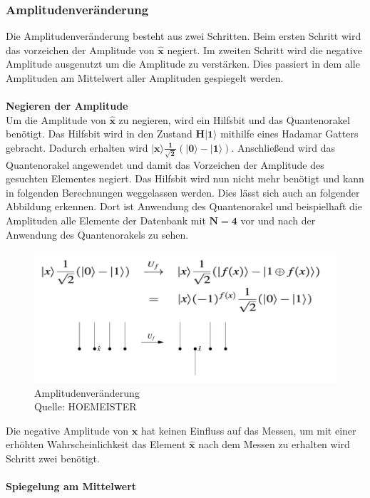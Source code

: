 \subsubsection{Amplitudenveränderung}
Die Amplitudenveränderung besteht aus zwei Schritten. Beim ersten Schritt wird das vorzeichen der Amplitude von $\mathbf{\hat x}$ negiert. Im zweiten Schritt wird die negative Amplitude ausgenutzt um die Amplitude zu verstärken. Dies passiert in dem alle Amplituden am Mittelwert aller Amplituden gespiegelt werden. 
\\ \\
\textbf{Negieren der Amplitude}
 \\
Um die Amplitude von $\mathbf{\hat x}$ zu negieren, wird ein Hilfsbit und das Quantenorakel benötigt. Das Hilfsbit wird in den Zustand $\mathbf{H|1\rangle}$ mithilfe eines Hadamar Gatters gebracht. Dadurch erhalten wird $\mathbf{|x\rangle \frac{1}{\sqrt 2}(|0\rangle - |1\rangle )}$. Anschließend wird das Quantenorakel angewendet und damit das Vorzeichen der Amplitude des gesuchten Elementes negiert. Das Hilfsbit wird nun nicht mehr benötigt und kann in folgenden Berechnungen weggelassen werden. Dies lässt sich auch an folgender Abbildung erkennen. Dort ist Anwendung des Quantenorakel und beispielhaft die Amplituden alle Elemente der Datenbank mit $\mathbf{N=4}$ vor und nach der Anwendung des Quantenorakels zu sehen.
\begin{figure}[hbtp]
	\centering
	\includegraphics[width=.8\textwidth]{figures/amplitudenveraenderung.png}
	\caption{Amplitudenveränderung \\ Quelle: HOEMEISTER}
	\label{fig:changeAmplitude}
\end{figure}
Die negative Amplitude von $\mathbf{\hat x}$ hat keinen Einfluss auf das Messen, um mit einer erhöhten Wahrscheinlichkeit das Element $\mathbf{\hat x}$ nach dem Messen zu erhalten wird Schritt zwei benötigt.
\\\\
\textbf{Spiegelung am Mittelwert} \\
\label{sec:spiegelnAmMittelwert} 
